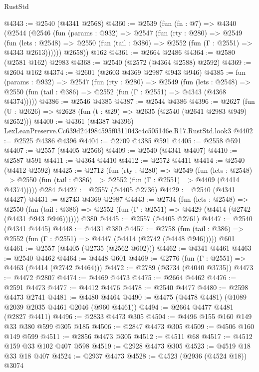\begin{lexlean}{RustStd}
\begin{coremodule}
@4343 := @2540 (@4341 @2568)
@4360 := @2539
    (fun (fn : @7) =>
    @4340
      (@2544
        (@2546
          (fun (params : @932) =>
          @2547
            (fun (rty : @280) =>
            @2549
              (fun (lets : @2548) =>
              @2550 (fun (tail : @386) => @2552 (fun (Γ : @2551) => @4343 @2613))))))
        @2658))
    @162
@4361 := @2664 @2486
@4364 := @2580 (@2581 @162) @2983
@4368 := @2540 (@2572 (@4364 @2588) @2592)
@4369 := @2604 @162
@4374 := @2601 (@2603 @4369 @2987 @943 @946)
@4385 := fun (params : @932) =>
  @2547
    (fun (rty : @280) =>
    @2549
      (fun (lets : @2548) =>
      @2550 (fun (tail : @386) => @2552 (fun (Γ : @2551) => @4343 (@4368 @4374)))))
@4386 := @2546 @4385
@4387 := @2544 @4386
@4396 := @2627 (fun (U : @2626) => @2628 (fun (t : @29) => @2635 (@2540 (@2641 @2983 @949) @2652)))
@4400 := @4361 (@4387 @4396) LexLeanPreserve.Cc639d244984595f0311043c4c505146e.R17.RustStd.look3
@4402 := @2525 @4386 @4396
@4404 := @2709 @4385 @591
@4405 := @2558 @591
@4407 := @2557 (@4405 @2566)
@4409 := @2540 (@4341 @4407)
@4410 := @2587 @591
@4411 := @4364 @4410
@4412 := @2572 @4411
@4414 := @2540 (@4412 @2592)
@4425 := @2712
    (fun (rty : @280) =>
    @2549
      (fun (lets : @2548) =>
      @2550 (fun (tail : @386) => @2552 (fun (Γ : @2551) => @4409 (@4414 @4374)))))
    @284
@4427 := @2557 (@4405 @2736)
@4429 := @2540 (@4341 @4427)
@4431 := @2743 @4369 @2987
@4443 := @2734
    (fun (lets : @2548) =>
    @2550 (fun (tail : @386) => @2552 (fun (Γ : @2551) => @4429 (@4414 (@2742 (@4431 @943 @946))))))
    @380
@4445 := @2557 (@4405 @2761)
@4447 := @2540 (@4341 @4445)
@4448 := @4431 @380
@4457 := @2758
    (fun (tail : @386) => @2552 (fun (Γ : @2551) => @4447 (@4414 (@2742 (@4448 @946)))))
    @601
@4461 := @2557 (@4405 (@2735 (@2562 @602)))
@4462 := @4341 @4461
@4463 := @2540 @4462
@4464 := @4448 @601
@4469 := @2776 (fun (Γ : @2551) => @4463 (@4414 (@2742 @4464)))
@4472 := @2789 (@3734 (@4040 @3735))
@4473 := @4472 @2807
@4474 := @4469 @4473
@4475 := @2664 @4462
@4476 := @2591 @4473
@4477 := @4412 @4476
@4478 := @2540 @4477
@4480 := @2598 @4473 @2741
@4481 := @4480 @4464
@4490 := @4475 (@4478 @4481) (@1089 @2039 @2035 @4461 @2046 (@960 @4461))
@4494 := @2664 @4477 @4481 (@2827 @4411)
@4496 := @2833 @4473 @305
@4504 := @4496 @155 @160 @149 @33 @380 @599 @305 @185
@4506 := @2847 @4473 @305
@4509 := @4506 @160 @149 @599
@4511 := @2856 @4473 @305
@4512 := @4511 @68
@4517 := @4512 @159 @33 @102 @407 @598
@4519 := @2928 @4473 @305
@4523 := @4519 @18 @33 @18 @407
@4524 := @2937 @4473
@4528 := @4523 (@2936 (@4524 @18)) @3074

\end{coremodule}
\end{lexlean}

